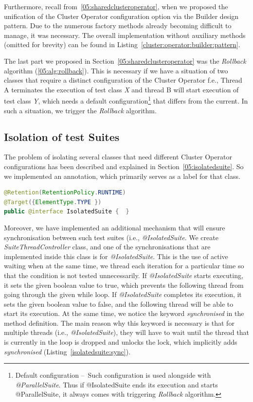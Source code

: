 Furthermore, recall from~\ref{05:sharedclusteroperator}, when we proposed the unification of the Cluster Operator configuration
option via the Builder design pattern.
Due to the numerous factory methods already becoming difficult to manage, it was necessary.
The overall implementation without auxiliary methods (omitted for brevity) can be found in Listing~\ref{cluster:operator:builder:pattern}.

The last part we proposed in Section~\ref{05:sharedclusteroperator} was the \emph{Rollback} algorithm (\ref{05:alg:rollback}).
This is necessary if we have a situation of two classes that require a distinct configuration of the Cluster Operator f.e.,
Thread A terminates the execution of test class \emph{X} and thread B will start execution of test class \emph{Y},
which needs a default configuration\footnote{Default configuration \---\ Such configuration is used alongside with \emph{@ParallelSuite}.
Thus if @IsolatedSuite ends its execution and starts @ParallelSuite, it always comes with triggering \emph{Rollback} algorithm.} that differs from the current.
In such a situation, we trigger the \emph {Rollback} algorithm.

\subsection{Isolation of test Suites}
\label{05:sub:sec:isolation:of:test:suites}

The problem of isolating several classes that need different Cluster Operator configurations has been described and explained in Section~\ref{05:isolatedsuite}.
So we implemented an annotation, which primarily serves as a label for that class.
\begin{lstlisting}[language=Java,label=annotation:isolatedsuite,caption=Implementation of the @IsolatedSuite annotation,frame=tb]
@Retention(RetentionPolicy.RUNTIME)
@Target({ElementType.TYPE })
public @interface IsolatedSuite {  }
\end{lstlisting}
Moreover, we have implemented an additional mechanism that will ensure synchronisation between such test suites
(i.e., \emph{@IsolatedSuite}. We create \emph{SuiteThreadController} class, and one of the synchronisations that are
implemented inside this class is for \emph {@IsolatedSuite}. This is the use of active waiting when at the same time,
we thread each iteration for a particular time so that the condition is not tested unnecessarily. If \emph{@IsolatedSuite}
starts executing, it sets the given boolean value to true, which prevents the following thread from going through the
given while loop. If \emph{@IsolatedSuite} completes its execution, it sets the given boolean value to false, and
the following thread will be able to start its execution. At the same time, we notice the keyword \emph{synchronised}
in the method definition. The main reason why this keyword is necessary is that for multiple threads (i.e., \emph{@IsolatedSuite}),
they will have to wait until the thread that is currently in the loop is dropped and unlocks the lock, which implicitly
adds \emph {synchronised} (Listing~\ref{isolatedsuite:sync}).

